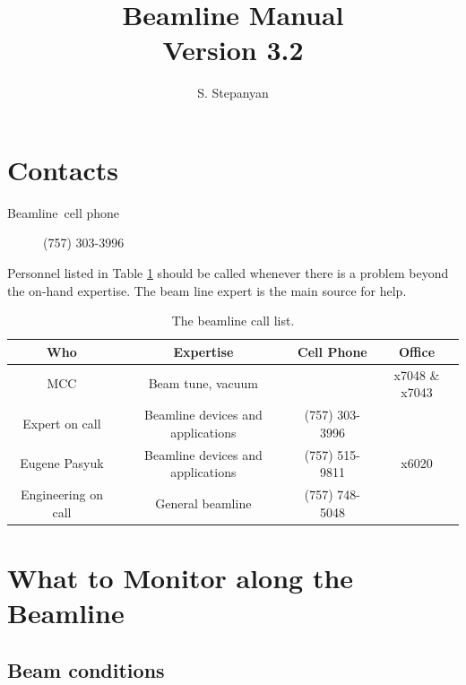 \documentclass[12pt]{article}
\newcommand{\versionnumber}{3.2}
\begin{document}
\title{Beamline Manual\\\normalsize Version \versionnumber}
\author{S. Stepanyan}
\maketitle



\section{Contacts\label{beamline_contacts}}

\begin{description}
\item [Beamline~cell phone] (757) 303-3996
\end{description}

Personnel listed in Table \ref{tab:calllist} should be called whenever there
is a problem beyond the on-hand expertise. The beam line expert is the main source for help.  
\begin{table}[tbhp]
\vspace{0.3cm}
{\centering \begin{tabular}{|c|c|c|c|}
\hline 
Who&Expertise&Cell Phone&Office\\
\hline 
\hline 
MCC&Beam tune, vacuum&&x7048 \& x7043\\
\hline 
Expert on call&Beamline devices and applications&(757) 303-3996&\\
\hline 
Eugene Pasyuk&Beamline devices and applications&(757) 515-9811&x6020\\
\hline 
Engineering on call&General beamline&(757) 748-5048&\\
\hline 
\end{tabular}\par}
\vspace{0.3cm}


\caption{The beamline call list.\label{tab:calllist}}
\end{table} 



\section{What to Monitor along the Beamline}


\subsection{Beam conditions}
\indent
\end{document}
